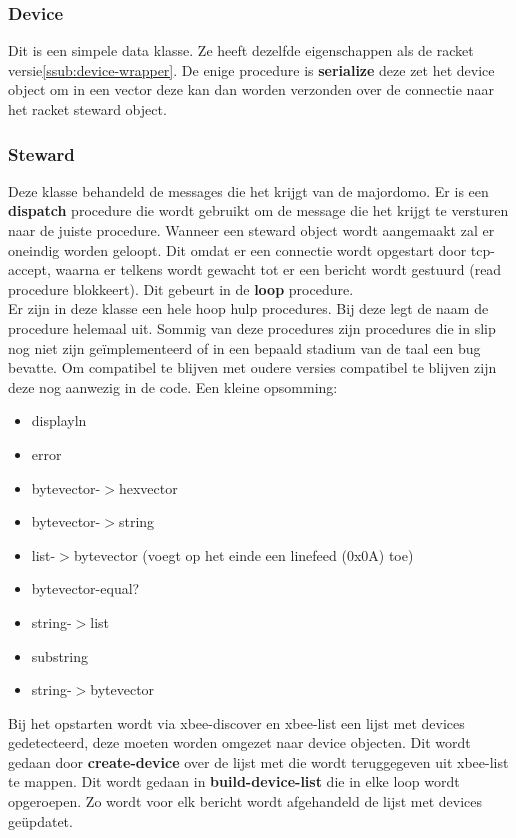 \documentclass{article}
\begin{document}
\subsubsection{Device}
\label{ssub:device-on-steward}
Dit is een simpele data klasse. Ze heeft dezelfde eigenschappen als de racket versie\ref{ssub:device-wrapper}. De enige procedure is \textbf{serialize} deze zet het device object om in een vector deze kan dan worden verzonden over de connectie naar het racket steward object.

\subsubsection{Steward}
\label{ssub:steward-slip}
Deze klasse behandeld de messages die het krijgt van de majordomo. Er is een \textbf{dispatch} procedure die wordt gebruikt om de message die het krijgt te versturen naar de juiste procedure. Wanneer een steward object wordt aangemaakt zal er oneindig worden geloopt. Dit omdat er een connectie wordt opgestart door tcp-accept, waarna er telkens wordt gewacht tot er een bericht wordt gestuurd (read procedure blokkeert). Dit gebeurt in de \textbf{loop} procedure.\\
Er zijn in deze klasse een hele hoop hulp procedures. Bij deze legt de naam de procedure helemaal uit. Sommig van deze procedures zijn procedures die in slip nog niet zijn ge\"implementeerd of in een bepaald stadium van de taal een bug bevatte. Om compatibel te blijven met oudere versies compatibel te blijven zijn deze nog aanwezig in de code. Een kleine opsomming:
\begin{itemize}
	\item displayln
	\item error
	\item bytevector-$>$hexvector 
	\item bytevector-$>$string
	\item list-$>$bytevector (voegt op het einde een linefeed (0x0A) toe)
	\item bytevector-equal?
	\item string-$>$list
	\item substring
	\item string-$>$bytevector
\end{itemize}
Bij het opstarten wordt via xbee-discover en xbee-list een lijst met devices gedetecteerd, deze moeten worden omgezet naar device objecten. Dit wordt gedaan door \textbf{create-device} over de lijst met die wordt teruggegeven uit xbee-list te mappen. Dit wordt gedaan in \textbf{build-device-list} die in elke loop wordt opgeroepen. Zo wordt voor elk bericht wordt afgehandeld de lijst met devices ge\"updatet.\\
\end{document}
